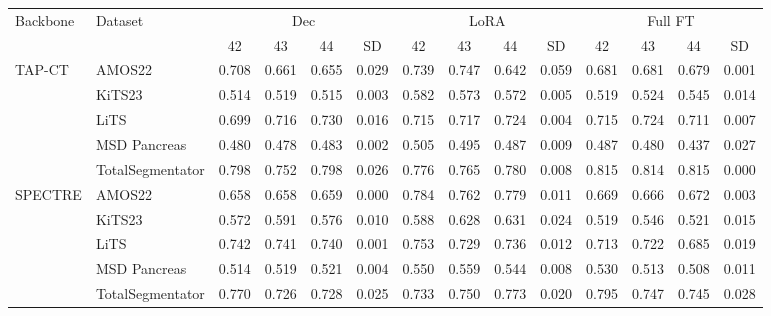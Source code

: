 \setlength{\tabcolsep}{3.5pt}
\begin{tabular}{@{}llcccccccccccc@{}}
\toprule
Backbone & Dataset & \multicolumn{4}{c}{Dec} & \multicolumn{4}{c}{LoRA} & \multicolumn{4}{c}{Full FT} \\
\cmidrule(lr){3-6}\cmidrule(lr){7-10}\cmidrule(lr){11-14}
 & & 42 & 43 & 44 & SD & 42 & 43 & 44 & SD & 42 & 43 & 44 & SD \\
\midrule
TAP-CT & AMOS22 & 0.708 & 0.661 & 0.655 & 0.029 & 0.739 & 0.747 & 0.642 & 0.059 & 0.681 & 0.681 & 0.679 & 0.001 \\
 & KiTS23 & 0.514 & 0.519 & 0.515 & 0.003 & 0.582 & 0.573 & 0.572 & 0.005 & 0.519 & 0.524 & 0.545 & 0.014 \\
 & LiTS & 0.699 & 0.716 & 0.730 & 0.016 & 0.715 & 0.717 & 0.724 & 0.004 & 0.715 & 0.724 & 0.711 & 0.007 \\
 & MSD Pancreas & 0.480 & 0.478 & 0.483 & 0.002 & 0.505 & 0.495 & 0.487 & 0.009 & 0.487 & 0.480 & 0.437 & 0.027 \\
 & TotalSegmentator & 0.798 & 0.752 & 0.798 & 0.026 & 0.776 & 0.765 & 0.780 & 0.008 & 0.815 & 0.814 & 0.815 & 0.000 \\
\addlinespace
SPECTRE & AMOS22 & 0.658 & 0.658 & 0.659 & 0.000 & 0.784 & 0.762 & 0.779 & 0.011 & 0.669 & 0.666 & 0.672 & 0.003 \\
 & KiTS23 & 0.572 & 0.591 & 0.576 & 0.010 & 0.588 & 0.628 & 0.631 & 0.024 & 0.519 & 0.546 & 0.521 & 0.015 \\
 & LiTS & 0.742 & 0.741 & 0.740 & 0.001 & 0.753 & 0.729 & 0.736 & 0.012 & 0.713 & 0.722 & 0.685 & 0.019 \\
 & MSD Pancreas & 0.514 & 0.519 & 0.521 & 0.004 & 0.550 & 0.559 & 0.544 & 0.008 & 0.530 & 0.513 & 0.508 & 0.011 \\
 & TotalSegmentator & 0.770 & 0.726 & 0.728 & 0.025 & 0.733 & 0.750 & 0.773 & 0.020 & 0.795 & 0.747 & 0.745 & 0.028 \\
\bottomrule
\end{tabular}

